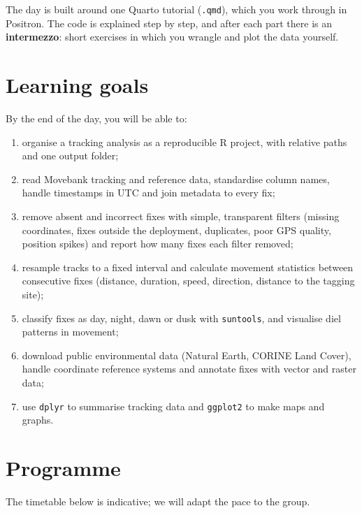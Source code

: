 \documentclass[11pt,a4paper]{article}
\begin{document}
The day is built around one Quarto tutorial (\texttt{.qmd}), which you work through in Positron. The code is explained step by step, and after each part there is an \textbf{intermezzo}: short exercises in which you wrangle and plot the data yourself.

\section{Learning goals}

\begin{goalbox}
By the end of the day, you will be able to:
\begin{enumerate}[leftmargin=*]
\item organise a tracking analysis as a reproducible R project, with relative paths and one output folder;
\item read Movebank tracking and reference data, standardise column names, handle timestamps in UTC and join metadata to every fix;
\item remove absent and incorrect fixes with simple, transparent filters (missing coordinates, fixes outside the deployment, duplicates, poor GPS quality, position spikes) and report how many fixes each filter removed;
\item resample tracks to a fixed interval and calculate movement statistics between consecutive fixes (distance, duration, speed, direction, distance to the tagging site);
\item classify fixes as day, night, dawn or dusk with \texttt{suntools}, and visualise diel patterns in movement;
\item download public environmental data (Natural Earth, CORINE Land Cover), handle coordinate reference systems and annotate fixes with vector and raster data;
\item use \texttt{dplyr} to summarise tracking data and \texttt{ggplot2} to make maps and graphs.
\end{enumerate}
\end{goalbox}

\section{Programme}

The timetable below is indicative; we will adapt the pace to the group.
\end{document}

